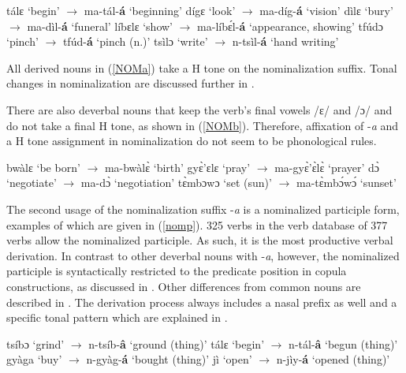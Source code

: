 \begin{exe} \ex \label{NOMa}
\begin{xlist}
\ex tálɛ `begin' $\rightarrow$ ma-tál-{\bfseries á} `beginning'
\ex dígɛ `look' $\rightarrow$ ma-díg-{\bfseries á} `vision'
\ex dìlɛ `bury' $\rightarrow$ ma-dìl-{\bfseries á} `funeral'
\ex líbɛlɛ `show' $\rightarrow$ ma-líbɛ́l-{\bfseries á} `appearance, showing'
\ex tfúdɔ `pinch' $\rightarrow$ tfúd-{\bfseries á} `pinch (n.)'
\ex tsìlɔ `write' $\rightarrow$ n-tsìl-{\bfseries á} `hand writing'
\end{xlist}
\end{exe}

\noindent All derived nouns in (\ref{NOMa}) take a H tone on the nominalization suffix. Tonal changes in nominalization are discussed further in .

There are also deverbal nouns that keep the verb's final vowels /ɛ/ and /ɔ/ and do not take a final H tone, as shown in (\ref{NOMb}). Therefore, affixation of -{\itshape a} and a H tone assignment in nominalization do not seem to be phonological rules.

\begin{exe} \ex \label{NOMb}
\begin{xlist}
\ex bwàlɛ `be born' $\rightarrow$ ma-bwàlɛ̀ `birth'
\ex gyɛ̀'ɛlɛ `pray' $\rightarrow$ ma-gyɛ̀'ɛ̀lɛ̀ `prayer'
\ex dɔ̀ `negotiate' $\rightarrow$ ma-dɔ̀ `negotiation'
\ex tɛ̀mbɔwɔ `set (sun)' $\rightarrow$ ma-tɛ̀mbɔ́wɔ́ `sunset'
\end{xlist}
\end{exe}

The second usage of the nominalization suffix -{\itshape a} is a nominalized participle form, examples of which are given in (\ref{nomp}).  325 verbs in the verb database of 377 verbs allow the nominalized participle. As such, it is the most productive verbal derivation. In contrast to other deverbal nouns with -{\itshape a}, however, the nominalized participle is syntactically restricted to the predicate position in copula constructions, as discussed in . Other differences from common nouns are described in . The derivation process always includes a nasal prefix as well and a specific tonal pattern which are explained in .

\begin{exe} \ex \label{nomp}
\begin{xlist}
\ex tsíbɔ `grind' $\rightarrow$ n-tsíb-{\bfseries â} `ground (thing)' 
\ex tálɛ `begin' $\rightarrow$ n-tál-{\bfseries â} `begun (thing)'
\ex gyàga `buy' $\rightarrow$ n-gyàg-{\bfseries á} `bought (thing)'
\ex jì `open' $\rightarrow$ n-jìy-{\bfseries á} `opened (thing)'
\end{xlist}
\end{exe}

